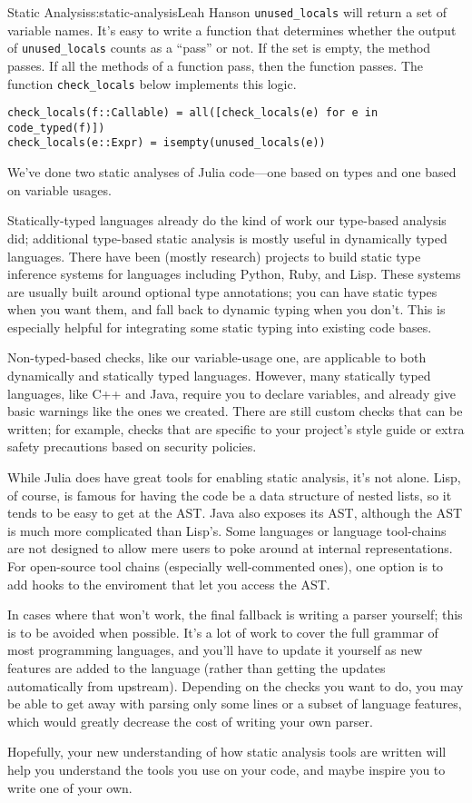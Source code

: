 \begin{aosachapter}{Static Analysis}{s:static-analysis}{Leah Hanson}
\texttt{unused\_locals} will return a set of variable names. It's easy
to write a function that determines whether the output of
\texttt{unused\_locals} counts as a ``pass'' or not. If the set is
empty, the method passes. If all the methods of a function pass, then
the function passes. The function \texttt{check\_locals} below
implements this logic.

\begin{verbatim}
check_locals(f::Callable) = all([check_locals(e) for e in code_typed(f)])
check_locals(e::Expr) = isempty(unused_locals(e))
\end{verbatim}

\label{conclusion}

We've done two static analyses of Julia code---one based on types and
one based on variable usages.

Statically-typed languages already do the kind of work our type-based
analysis did; additional type-based static analysis is mostly useful in
dynamically typed languages. There have been (mostly research) projects
to build static type inference systems for languages including Python,
Ruby, and Lisp. These systems are usually built around optional type
annotations; you can have static types when you want them, and fall back
to dynamic typing when you don't. This is especially helpful for
integrating some static typing into existing code bases.

Non-typed-based checks, like our variable-usage one, are applicable to
both dynamically and statically typed languages. However, many
statically typed languages, like C++ and Java, require you to declare
variables, and already give basic warnings like the ones we created.
There are still custom checks that can be written; for example, checks
that are specific to your project's style guide or extra safety
precautions based on security policies.

While Julia does have great tools for enabling static analysis, it's not
alone. Lisp, of course, is famous for having the code be a data
structure of nested lists, so it tends to be easy to get at the AST.
Java also exposes its AST, although the AST is much more complicated
than Lisp's. Some languages or language tool-chains are not designed to
allow mere users to poke around at internal representations. For
open-source tool chains (especially well-commented ones), one option is
to add hooks to the enviroment that let you access the AST.

In cases where that won't work, the final fallback is writing a parser
yourself; this is to be avoided when possible. It's a lot of work to
cover the full grammar of most programming languages, and you'll have to
update it yourself as new features are added to the language (rather
than getting the updates automatically from upstream). Depending on the
checks you want to do, you may be able to get away with parsing only
some lines or a subset of language features, which would greatly
decrease the cost of writing your own parser.

Hopefully, your new understanding of how static analysis tools are
written will help you understand the tools you use on your code, and
maybe inspire you to write one of your own.

\end{aosachapter}
